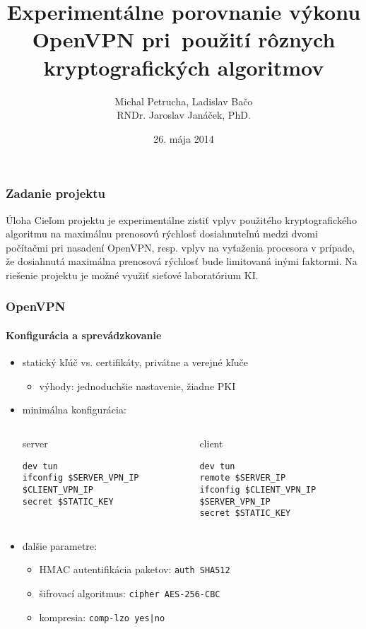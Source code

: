 \documentclass{beamer}
\title{Experimentálne porovnanie výkonu OpenVPN pri~použití rôznych kryptografických algoritmov}
\author[Petrucha, Bačo]{Michal Petrucha, Ladislav Bačo\\{\tiny RNDr. Jaroslav Janáček, PhD.}}
\institute{
Fakulta matematiky, fyziky a informatiky\\
Univerzita Komenského, Bratislava
}
\date{26. mája 2014}
\begin{document}
\frame{\titlepage}

\begin{frame}
	\frametitle{Zadanie projektu}
	\begin{block}{Úloha}
	\justifying
	Cieľom projektu je experimentálne zistiť vplyv použitého kryptografického algoritmu na maximálnu prenosovú rýchlosť dosiahnuteľnú medzi dvomi počítačmi pri nasadení OpenVPN, resp. vplyv na vyťaženia procesora v prípade, že dosiahnutá maximálna prenosová rýchlosť bude limitovaná inými faktormi. Na riešenie projektu je možné využiť sieťové laboratórium KI.
	\end{block}
\end{frame}

\begin{frame}[fragile]
	\frametitle{OpenVPN}
	\framesubtitle{Konfigurácia a sprevádzkovanie}
	\begin{itemize}
		\item statický kľúč vs. certifikáty, privátne a verejné kľuče
			\begin{itemize}
				\item výhody: jednoduchšie nastavenie, žiadne PKI
			\end{itemize}
		\item minimálna konfigurácia:
			\begin{columns}
				\tiny
					\begin{block}{server}
\begin{verbatim}
dev tun
ifconfig $SERVER_VPN_IP $CLIENT_VPN_IP
secret $STATIC_KEY
\end{verbatim}
					\end{block}
					\begin{block}{client}
\begin{verbatim}
dev tun
remote $SERVER_IP
ifconfig $CLIENT_VPN_IP $SERVER_VPN_IP
secret $STATIC_KEY
\end{verbatim}
					\end{block}
			\end{columns}

		\item ďalšie parametre:
			\begin{itemize}
				\item HMAC autentifikácia paketov: \texttt{auth SHA512}
				\item šifrovací algoritmus: \texttt{cipher AES-256-CBC}
				\item kompresia: \texttt{comp-lzo yes|no}
			\end{itemize}
	\end{itemize}
\end{frame}
\end{document}
